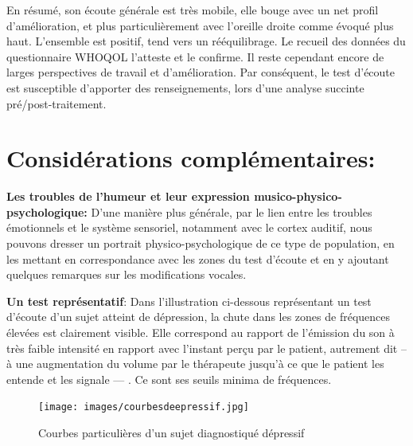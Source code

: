                En résumé, son écoute générale est très mobile, elle bouge avec un
                net profil d'amélioration, et plus particulièrement avec l'oreille
                droite comme évoqué plus haut. L'ensemble est positif, tend vers un
                rééquilibrage. Le recueil des données du
                questionnaire WHOQOL l'atteste et le confirme.
                Il reste cependant encore de larges perspectives de travail et d'amélioration.
                Par conséquent, le test d'écoute est susceptible d'apporter des renseignements, lors
                    d'une analyse succinte pré/post-traitement.






                    \section{Considérations complémentaires:}


                  \textbf{Les troubles de l'humeur et leur expression
                  musico-phy\-sico-psy\-cho\-lo\-gi\-que:}
                  D'une manière plus générale, par le lien entre les troubles
                  émotionnels et le
                  système sensoriel, notamment avec le cortex auditif, nous
                  pouvons dresser un portrait
                  physico-psychologique de ce type de population,
                  en les mettant en correspondance avec les zones du test d'écoute et
                  en y ajoutant quelques remarques sur les modifications vocales.

                  \textbf{Un test représentatif}:
                  Dans l'illustration ci-dessous représentant un test
                  d'écoute d'un sujet atteint de dépression, la
                  chute dans les zones de fréquences élevées est
                  clairement visible. Elle correspond au rapport de l'émission du son à
                  très faible intensité en rapport avec
                  l'instant perçu par le
                  patient, autrement dit  -- à une augmentation
                  du volume
                  par le thérapeute jusqu'à ce que le patient les entende et les signale
                  --- .
                  Ce sont ses seuils minima de fréquences.
                  \begin{figure}[ht]
                  \centering
                  \texttt{[image: images/courbesdeepressif.jpg]}
                  \caption{Courbes particulières d'un sujet diagnostiqué dépressif}
                  \label{fig:courbes du dépressif}
                    \end{figure}


